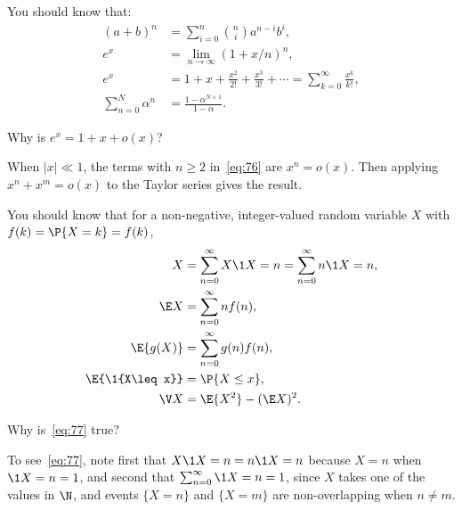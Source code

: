 You should know that:
\begin{subequations}
  \begin{align}
    (a+b)^n &= \sum_{i=0}^n {n \choose i} a^{n-i} b^i, \label{eq:71}\\
e^x &= \lim_{n\to\infty} (1+x/n)^n, \label{eq:65}\\
    e^x &= 1 + x + \frac{x^2}{2!} + \frac{x^3}{3!} + \cdots = \sum_{k=0}^{\infty} \frac{x^k}{k!}, \label{eq:76}\\
    \sum_{n=0}^N \alpha^n &= \frac{1-\alpha^{N+1}}{1-\alpha}. \label{eq:61}
\end{align}
\end{subequations}

\begin{extra}
  Why is $e^{x} = 1 +x + o(x)$?
\begin{solution}
    When $|x|\ll 1$, the  terms with $n\geq 2$ in~\cref{eq:76} are $x^n = o(x)$. Then applying $x^n + x^m = o(x)$ to the Taylor series gives the result.
\end{solution}
\end{extra}


You should know that for a non-negative, integer-valued random variable $X$ with   $f(k)= \P{X = k} = f(k)$, 
\begin{subequations}
\begin{align}
X&=\sum_{n=0}^\infty X\1{X=n} = \sum_{n=0}^\infty n \1{X=n},   \label{eq:77} \\
\E X &= \sum_{n=0}^\infty n f(n), \\
\E{g(X)} &= \sum_{n=0}^\infty g(n) f(n),  \label{eq:66}\\
\E{\1{X\leq x}} &= \P{X\leq x}, \label{eq:74}\\
\V X &= \E{X^2} - (\E X)^2.\label{eq:68}
\end{align}
\end{subequations}

\begin{extra}
  Why is~\cref{eq:77} true?
\begin{solution}
To see~\cref{eq:77}, note first that $X\1{X=n} = n\1{X=n}$ because $X=n$ when $\1{X=n} =1$, and second that $\sum_{n=0}^\infty \1{X=n} =1$, since $X$ takes one of the values in $\N$, and events $\{X=n\}$ and $\{X=m\}$ are non-overlapping when $n\neq m$. 
\end{solution}
\end{extra}

